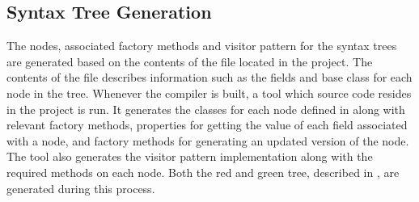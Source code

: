 \subsection{Syntax Tree Generation}
\label{subsec:roslyn_syntax_tree_generation}
The nodes, associated factory methods and visitor pattern for the syntax trees are generated based on the contents of the  file located in the  project. The contents of the file describes information such as the fields and base class for each node in the tree. Whenever the compiler is built, a tool which source code resides in the  project is run. It generates the classes for each node defined in  along with relevant factory methods, properties for getting the value of each field associated with a node, and factory methods for generating an updated version of the node. The tool also generates the visitor pattern implementation along with the required  methods on each node. Both the red and green tree, described in , are generated during this process.

	
	



